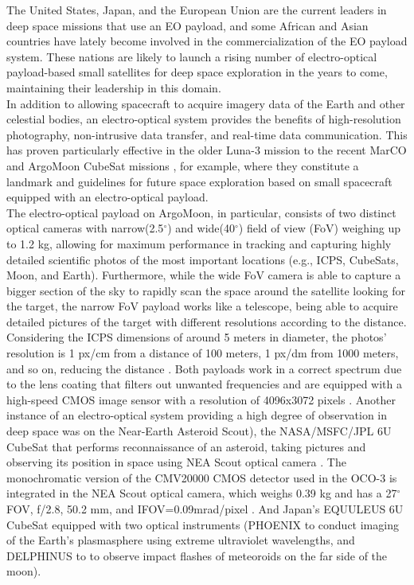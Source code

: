 \documentclass[final,5p,times,twocolumn]{elsarticle}
\begin{document}
The United States, Japan, and the European Union are the current leaders in deep space missions that use an EO payload, and some African and Asian countries have lately become involved in the commercialization of the EO payload system. These nations are likely to launch a rising number of electro-optical payload-based small satellites for deep space exploration in the years to come, maintaining their leadership in this domain.\\
In addition to allowing spacecraft to acquire imagery data of the Earth and other celestial bodies, an electro-optical system provides the benefits of high-resolution photography, non-intrusive data transfer, and real-time data communication. This has proven particularly effective in the older Luna-3 mission \citep{siddiqi2018beyond} to the recent MarCO \citep{schoolcraft2017marco} and ArgoMoon CubeSat missions \citep{di2019argomoon}, for example, where they constitute a landmark and guidelines for future space exploration based on small spacecraft equipped with an electro-optical payload. \\The electro-optical payload on ArgoMoon, in particular, consists of two distinct optical cameras \citep{di2019argomoon} with narrow(2.5$^\circ$) and wide(40$^\circ$) field of view (FoV) weighing up to 1.2 kg, allowing for maximum performance in tracking and capturing highly detailed scientific photos of the most important locations (e.g., ICPS, CubeSats, Moon, and Earth). Furthermore, while the wide FoV camera is able to capture a bigger section of the sky to rapidly scan the space around the satellite looking for the target, the narrow FoV payload works like a telescope, being able to acquire detailed pictures of the target with different resolutions according to the distance\citep{simonetti2020argomoon}. Considering the ICPS dimensions of around 5 meters in diameter, the photos’ resolution is 1 px/cm from a distance of 100 meters, 1 px/dm from 1000 meters, and so on, reducing the distance \citep{simonetti2020argomoon}. Both payloads work in a correct spectrum due to the lens coating that filters out unwanted frequencies and are equipped with a high-speed CMOS image sensor with a resolution of 4096x3072 pixels \citep{simonetti2020argomoon}. Another instance of an electro-optical system providing a high degree of observation in deep space was on the Near-Earth Asteroid Scout), the NASA/MSFC/JPL 6U CubeSat that performs reconnaissance of an asteroid, taking pictures and observing its position in space using NEA Scout optical camera \citep{mission2022nea}. The monochromatic version of the CMV20000 CMOS detector used in the OCO-3 is integrated in the NEA Scout optical camera, which weighs 0.39 kg and has a 27$^\circ$ FOV, f/2.8, 50.2 mm, and IFOV=0.09mrad/pixel \citep{mission2022nea}. And Japan's EQUULEUS 6U CubeSat equipped with two optical instruments \citep{funase2020mission} (PHOENIX to conduct imaging of the Earth's plasmasphere using extreme ultraviolet wavelengths, and DELPHINUS to to observe impact flashes of meteoroids on the far side of the moon).\\
\end{document}
